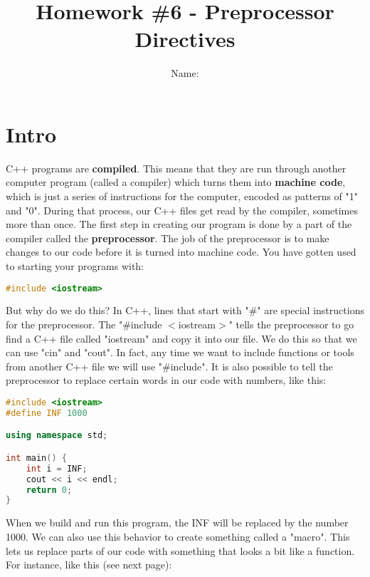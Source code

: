 \documentclass[a4paper,12pt]{article} %
\title{\textbf{Homework \#6 - Preprocessor Directives}}
\author{Name: }
\date{} %
\begin{document}
\maketitle %

\section{Intro}

C++ programs are \textbf{compiled}. This means that they are run through another computer program (called a compiler) which turns them into \textbf{machine code}, which is just a series of instructions for the computer, encoded as patterns of "1" and "0". During that process, our C++ files get read by the compiler, sometimes more than once. The first step in creating our program is done by a part of the compiler called the \textbf{preprocessor}. The job of the preprocessor is to make changes to our code before it is turned into machine code. You have gotten used to starting your programs with:

\vspace{5mm}
\begin{lstlisting}[language=C++]
#include <iostream>
\end{lstlisting}

\noindent
But why do we do this? In C++, lines that start with "\#" are special instructions for the preprocessor. The "\#include $<$iostream$>$" tells the preprocessor to go find a C++ file called "iostream" and copy it into our file. We do this so that we can use "cin" and "cout". In fact, any time we want to include functions or tools from another C++ file we will use "\#include". It is also possible to tell the preprocessor to replace certain words in our code with numbers, like this:

\vspace{5mm}
\begin{lstlisting}[language=C++]
#include <iostream>
#define INF 1000

using namespace std;

int main() {
	int i = INF;
	cout << i << endl;
	return 0;
}
\end{lstlisting}

\noindent
When we build and run this program, the INF will be replaced by the number 1000. We can also use this behavior to create something called a "macro". This lets us replace parts of our code with something that looks a bit like a function. For instance, like this (see next page): 
\end{document}
